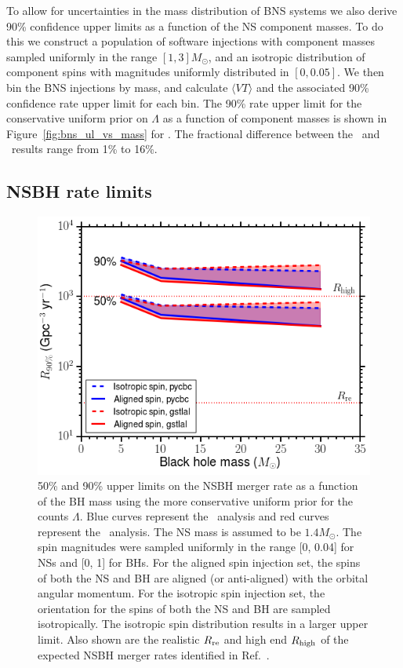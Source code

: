To allow for uncertainties in the mass distribution of \ac{BNS} systems we also
derive 90\% confidence upper limits as a function of the \ac{NS} component masses.
To do this we construct a population of software injections with component masses
sampled uniformly in the range $[1, 3]M_{\odot}$, and an isotropic distribution
of component spins with magnitudes uniformly distributed in $[0, 0.05]$. We then bin
the \ac{BNS} injections by mass, and calculate $\langle VT \rangle$ and the associated 90\%
confidence rate upper limit for each bin. The 90\% rate upper limit for the conservative
uniform prior on $\Lambda$ as a function of component masses is shown in 
Figure~\ref{fig:bns_ul_vs_mass} for \pycbc. The fractional difference between the \pycbc\
and \gstlal\ results range from 1\% to 16\%.

\subsection{NSBH rate limits}
\label{ssec:nsbh_rate_limits}

\begin{figure}[t]
\centering
\includegraphics[width=1.0\textwidth]{figs/chapter3/figure5.png}
\caption{\label{fig:nsbh_ul_vs_mass} 50\% and 90\% upper limits on the \ac{NSBH} merger rate
as a function of the \ac{BH} mass using the more conservative uniform prior for the counts $\Lambda$. 
Blue curves represent the \pycbc\ analysis and red curves
represent the \gstlal\ analysis. The \ac{NS} mass is assumed to be $1.4M_\odot$. The spin magnitudes
were sampled uniformly in the range [0, 0.04] for \acp{NS} and [0, 1] for \acp{BH}. For the aligned
spin injection set, the spins of both the \ac{NS} and \ac{BH} are aligned (or anti-aligned) with the
orbital angular momentum. For the isotropic spin injection set, the orientation for the
spins of both the \ac{NS} and \ac{BH} are sampled isotropically. The isotropic spin distribution results
in a larger upper limit. Also shown are the realistic $R_{\rm re}$ and high end
$R_{\rm high}$ of the expected \ac{NSBH} merger rates identified in Ref.~\citep{Abadie:2010cf}.}
\end{figure}

